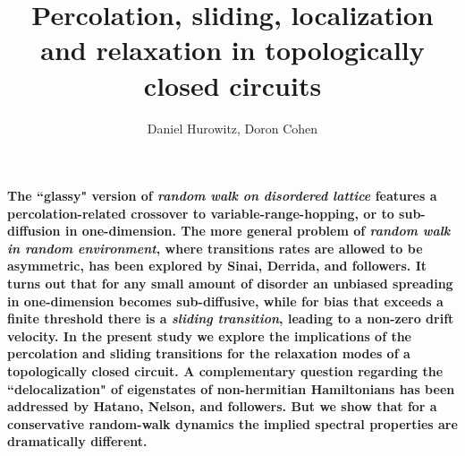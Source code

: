 \documentclass[aps,pre,floats,floatfix,twocolumn]{revtex4}
\begin{document}
 
\title{Percolation, sliding, localization and relaxation in topologically closed circuits}

\author{Daniel Hurowitz, Doron Cohen}



\maketitle

{\bf
The ``glassy" version of {\em random walk on disordered lattice}  
features a percolation-related crossover to variable-range-hopping,
or to sub-diffusion in one-dimension.  
The more general problem of {\em random walk in random environment}, 
where transitions rates are allowed to be asymmetric, 
has been explored by Sinai, Derrida, and followers.  
It turns out that for any small amount of disorder 
an unbiased spreading in one-dimension becomes sub-diffusive,  
while for bias that exceeds a finite threshold there 
is a {\em sliding transition}, leading to a non-zero drift velocity.
%
In the present study we explore the implications of the percolation and sliding transitions 
for the relaxation modes of a topologically closed circuit. 
A complementary question regarding  the ``delocalization" of eigenstates 
of non-hermitian Hamiltonians has been addressed by Hatano, Nelson, and followers. 
But we show that for a conservative random-walk dynamics 
the implied spectral properties are dramatically different.
}
\end{document}
